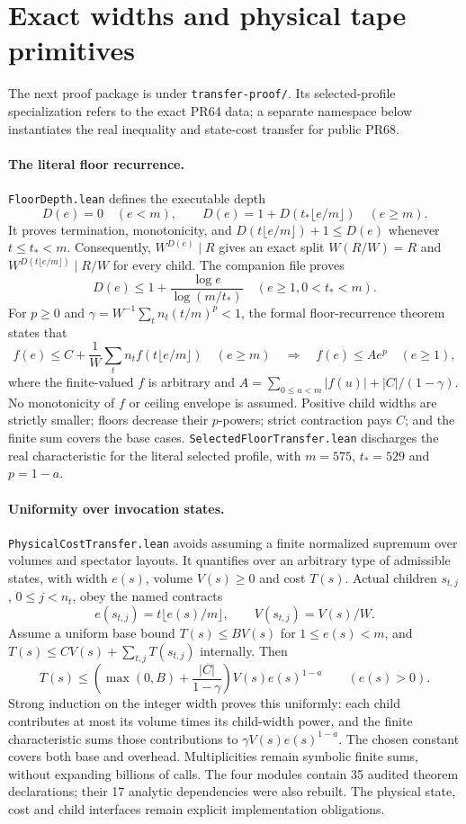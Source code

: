 \documentclass[11pt]{article}
\begin{document}
\section{Exact widths and physical tape primitives}
The next proof package is under \texttt{transfer-proof/}. Its selected-profile
specialization refers to the exact PR64 data; a separate namespace below
instantiates the real inequality and state-cost transfer for public PR68.

\paragraph{The literal floor recurrence.}
\texttt{FloorDepth.lean} defines the executable depth
\[
 D(e)=0\quad(e<m),\qquad D(e)=1+D(t_*\lfloor e/m\rfloor)\quad(e\ge m).
\]
It proves termination, monotonicity, and
$D(t\lfloor e/m\rfloor)+1\le D(e)$ whenever $t\le t_*<m$.
Consequently, $W^{D(e)}\mid R$ gives an exact split $W(R/W)=R$ and
$W^{D(t\lfloor e/m\rfloor)}\mid R/W$ for every child.
The companion file proves
\[
 D(e)\le1+\frac{\log e}{\log(m/t_*)}\quad(e\ge1, 0<t_*<m).
\]
For $p\ge0$ and $\gamma=W^{-1}\sum_t n_t(t/m)^p<1$, the formal
floor-recurrence theorem states that
\[
 f(e)\le C+\frac1W\sum_t n_t f(t\lfloor e/m\rfloor)\quad(e\ge m)
 \quad\Longrightarrow\quad f(e)\le Ae^p\quad(e\ge1),
\]
where the finite-valued $f$ is arbitrary and
$A=\sum_{0\le u<m}|f(u)|+|C|/(1-\gamma)$.
No monotonicity of $f$ or ceiling envelope is assumed. Positive child
widths are strictly smaller; floors decrease their $p$-powers; strict
contraction pays $C$; and the finite sum covers the base cases.
\texttt{SelectedFloorTransfer.lean} discharges the real characteristic
for the literal selected profile, with $m=575$, $t_*=529$ and $p=1-a$.

\paragraph{Uniformity over invocation states.}
\texttt{PhysicalCostTransfer.lean} avoids assuming a finite normalized
supremum over volumes and spectator layouts. It quantifies over an arbitrary
type of admissible states, with width $e(s)$, volume $V(s)\ge0$ and cost
$T(s)$. Actual children $s_{t,j}$, $0\le j<n_t$, obey the named contracts
\[
 e(s_{t,j})=t\lfloor e(s)/m\rfloor,\qquad V(s_{t,j})=V(s)/W.
\]
Assume a uniform base bound $T(s)\le BV(s)$ for $1\le e(s)<m$, and
$T(s)\le CV(s)+\sum_{t,j}T(s_{t,j})$ internally. Then
\[
 T(s)\le\left(\max(0,B)+\frac{|C|}{1-\gamma}\right)V(s)e(s)^{1-a}
 \qquad(e(s)>0).
\]
Strong induction on the integer width proves this uniformly: each
child contributes at most its volume times its child-width power, and
the finite characteristic sums those contributions to
$\gamma V(s)e(s)^{1-a}$. The chosen constant covers both base and
overhead. Multiplicities remain symbolic finite sums, without expanding
billions of calls. The four modules contain 35 audited theorem declarations;
their 17 analytic dependencies were also rebuilt. The physical state,
cost and child interfaces remain explicit implementation obligations.
\end{document}
